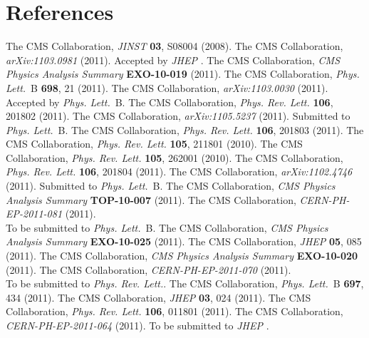 \documentclass[11pt]{article}
\def\Journal#1#2#3#4{{#1} {\bf #2}, #3 (#4)}
\def\PLB{{\em Phys. Lett.}~B}
\def\PRL{{\em Phys. Rev. Lett.}}
\def\PRD{{\em Phys. Rev.}~D}
\def\JINST{{\em JINST} }
\def\JHEP{{\em JHEP} }
\begin{document}
\section*{References}
\begin{thebibliography}{199}

The CMS Collaboration, \Journal{\JINST}{03}{S08004}{2008}.
The CMS Collaboration, {\em arXiv:1103.0981} (2011). Accepted by \JHEP.
The CMS Collaboration, {\em CMS Physics Analysis Summary} {\bf EXO-10-019} (2011).
The CMS Collaboration, \Journal{\PLB}{698}{21}{2011}.
The CMS Collaboration, {\em arXiv:1103.0030} (2011). Accepted by \PLB.
The CMS Collaboration, \Journal{\PRL}{106}{201802}{2011}.
The CMS Collaboration, {\em arXiv:1105.5237} (2011). Submitted to \PLB.
The CMS Collaboration, \Journal{\PRL}{106}{201803}{2011}.
The CMS Collaboration, \Journal{\PRL}{105}{211801}{2010}.
The CMS Collaboration, \Journal{\PRL}{105}{262001}{2010}.
The CMS Collaboration, \Journal{\PRL}{106}{201804}{2011}.
The CMS Collaboration, {\em arXiv:1102.4746} (2011). Submitted to \PLB.
The CMS Collaboration, {\em CMS Physics Analysis Summary} {\bf TOP-10-007} (2011).
The CMS Collaboration, {\em CERN-PH-EP-2011-081} (2011). \\To be submitted to \PLB.
The CMS Collaboration, {\em CMS Physics Analysis Summary} {\bf EXO-10-025} (2011).
The CMS Collaboration, \Journal{\JHEP}{05}{085}{2011}.
The CMS Collaboration, {\em CMS Physics Analysis Summary} {\bf EXO-10-020} (2011).
The CMS Collaboration, {\em CERN-PH-EP-2011-070} (2011). \\To be submitted to \PRL.
The CMS Collaboration, \Journal{\PLB}{697}{434}{2011}.
The CMS Collaboration, \Journal{\JHEP}{03}{024}{2011}.
The CMS Collaboration, \Journal{\PRL}{106}{011801}{2011}.
The CMS Collaboration, {\em CERN-PH-EP-2011-064} (2011). To be submitted to \JHEP.



\end{thebibliography}
\end{document}
